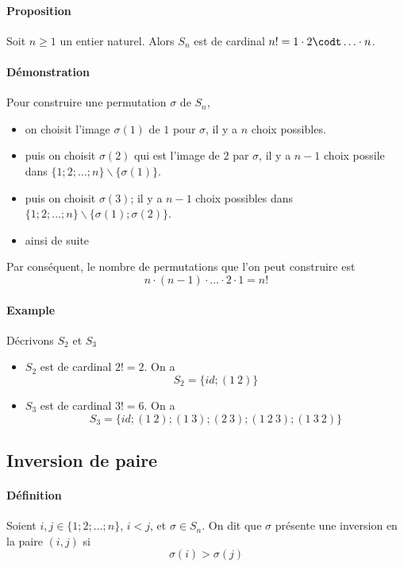 \paragraph{Proposition} Soit $n \geq 1$ un entier naturel. Alors $S_n$ est de cardinal $n! = 1 \cdot 2 \codt \ldots \cdot n$.

\paragraph{Démonstration} Pour construire une permutation $\sigma$ de $S_n$,
\begin{itemize}
  \item on choisit l'image $\sigma(1)$ de $1$ pour $\sigma$, il y a $n$ choix possibles.
  \item puis on choisit $\sigma(2)$ qui est l'image de $2$ par $\sigma$, il y a $n-1$ choix possile dans $\{1; 2; \ldots; n\} \backslash \{\sigma(1)\}$.
  \item puis on choisit $\sigma(3)$; il y a $n-1$ choix possibles dans $\{1; 2; \ldots; n\} \backslash \{\sigma(1); \sigma(2)\}$.
  \item ainsi de suite
\end{itemize}
Par conséquent, le nombre de permutations que l'on peut construire est 
$$n \cdot (n-1) \cdot \ldots \cdot 2 \cdot 1 = n!$$

\paragraph{Example} Décrivons $S_2$ et $S_3$
\begin{itemize}
  \item $S_2$ est de cardinal $2! = 2$. On a 
    $$S_2 = \{id; (1 ~ 2)\}$$
  \item $S_3$ est de cardinal $3! = 6$. On a
    $$S_3 = \{id; (1 ~ 2); (1 ~ 3); (2 ~ 3); (1 ~ 2 ~ 3); (1 ~ 3 ~ 2)\}$$
\end{itemize}

%
\subsection{Inversion de paire}
%
\paragraph{Définition} Soient $i, j \in \{1; 2; \ldots; n\}$, $i < j$, et $\sigma \in S_n$. On dit que $\sigma$ présente une inversion en la paire $(i, j)$ si 
$$\sigma(i) > \sigma(j)$$

